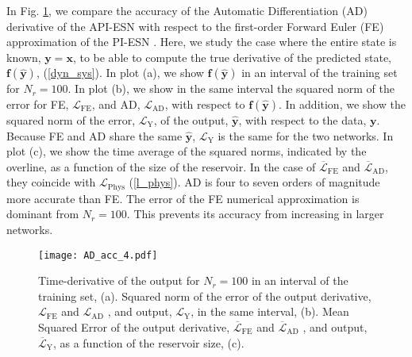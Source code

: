 \documentclass[runningheads]{llncs}
\begin{document}
In Fig. \ref{AD_acc}, we compare the accuracy of the Automatic Differentiation (AD) derivative of the API-ESN with respect to the first-order Forward Euler (FE) approximation of the PI-ESN \cite{doan2020learning}. Here, we study the case where the entire state is known, $\mathbf{y}=\mathbf{x}$, to be able to compute the true derivative of the predicted state, $\mathbf{f}(\mathbf{\mathbf{\hat{y}}})$,  (\ref{dyn_sys}). In plot (a), we show $\mathbf{f}(\mathbf{\mathbf{\hat{y}}})$ in an interval of the training set for $N_r=100$. In plot (b), we show in the same interval the squared norm of the error for FE, $\mathcal{L}_{\mathrm{FE}}$, and AD, $\mathcal{L}_{\mathrm{AD}}$, with respect to $\mathbf{f}(\mathbf{\mathbf{\hat{y}}})$. In addition, we show the squared norm of the error, $\mathcal{L}_{\mathrm{Y}}$, of the output, $\mathbf{\hat{y}}$, with respect to the data, $\mathbf{y}$.  Because FE and AD share the same $\mathbf{\hat{y}}$, $\mathcal{L}_{\mathrm{Y}}$ is the same for the two networks. In plot (c), we show the time average of the squared norms, indicated by the overline, as a function of the size of the reservoir. In the case of $\overline{\mathcal{L}}_{\mathrm{FE}}$ and $\overline{\mathcal{L}}_{\mathrm{AD}}$, they coincide with $\mathcal{L}_{\mathrm{Phys}}$ (\ref{l_phys}).  %
AD is four to seven orders of magnitude more accurate than FE. The error of the FE numerical approximation is dominant from $N_r=100$. This prevents its accuracy from increasing in larger networks.  
\begin{figure}
    \centering
    \texttt{[image: AD\_acc\_4.pdf]}
    \caption{Time-derivative of the output for $N_r=100$ in an interval of the training set, (a). Squared norm of the error of the output derivative, $\mathcal{L}_{\mathrm{FE}}$ and $\mathcal{L}_{\mathrm{AD}}$ , and output, $\mathcal{L}_{\mathrm{Y}}$, in the same interval, (b). Mean Squared Error of the output derivative, $\overline{\mathcal{L}}_{\mathrm{FE}}$ and $\overline{\mathcal{L}}_{\mathrm{AD}}$ , and output, $\overline{\mathcal{L}}_{\mathrm{Y}}$, as a function of the reservoir size, (c).}
    \label{AD_acc}
\end{figure}
\end{document}

